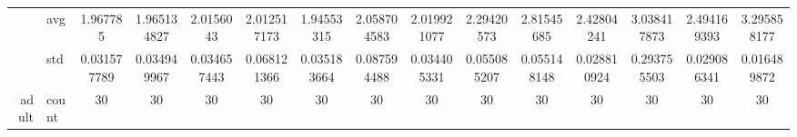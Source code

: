 \begin{table}[htbp]
{\begin{tabular}{rlccc|c|c|c|c|c|ccccc}
			                                                                               & avg                & \cellcolor[rgb]{ .506,  .776,  .486}1.967785                                   & \cellcolor[rgb]{ .494,  .773,  .486}1.965134827                                & \cellcolor[rgb]{ .765,  .851,  .502}2.0156043                                  & \cellcolor[rgb]{ .749,  .847,  .502}2.012517173 & \cellcolor[rgb]{ .388,  .745,  .482}\textcolor[rgb]{ 0,  .38,  0}{1.94553315}  & \cellcolor[rgb]{ 1,  .922,  .518}2.058704583    & \cellcolor[rgb]{ .788,  .859,  .502}2.019921077                                & \cellcolor[rgb]{ .996,  .827,  .502}2.29420573  & \cellcolor[rgb]{ .984,  .612,  .459}2.81545685  & \cellcolor[rgb]{ .992,  .773,  .49}2.42804241   & \cellcolor[rgb]{ .98,  .522,  .443}3.038417873  & \cellcolor[rgb]{ .992,  .745,  .486}2.494169393 & \cellcolor[rgb]{ .973,  .412,  .42}3.295858177  \\
			                                                                               & std                & 0.031577789                                                                    & 0.034949967                                                                    & 0.034657443                                                                    & 0.068121366                                     & 0.035183664                                                                    & 0.087594488                                     & 0.034405331                                                                    & 0.055085207                                     & 0.055148148                                     & 0.028810924                                     & 0.293755503                                     & 0.029086341                                     & 0.016489872                                     \\
			adult                                                                          & count              & 30                                                                             & 30                                                                             & 30                                                                             & 30                                              & 30                                                                             & 30                                              & 30                                                                             & 30                                              & 30                                              & 30                                              & 30                                              & 30                                              & 30                                              \\

\end{tabular}}
\end{table}
